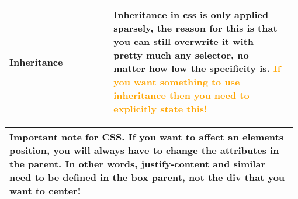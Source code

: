 \documentclass[main.tex,fontsize=8pt,paper=a4,paper=portrait,DIV=calc,]{scrartcl}
\begin{document}
\begin{table}[h!]
\begin{tabular}{|m{0.35\linewidth}|m{0.605\linewidth}|}
\\
\hline
Inheritance & 
Inheritance in css is only applied sparsely, the reason for this is that you can still overwrite it with pretty much any selector, no matter how low the specificity is.\newline
\textcolor{orange}{If you want something to use inheritance then you need to explicitly state this!}\\
\hline
\end{tabular}
\begin{tabular}{|m{0.977\linewidth}|}
\hline
\textbf{Important note for CSS. If you want to affect an elements position, you will always have to change the attributes in the parent. \newline
In other words, justify-content and similar need to be defined in the box parent, not the div that you want to center!}\\
\hline
\end{tabular}
\end{table}
\pagebreak
\end{document}
